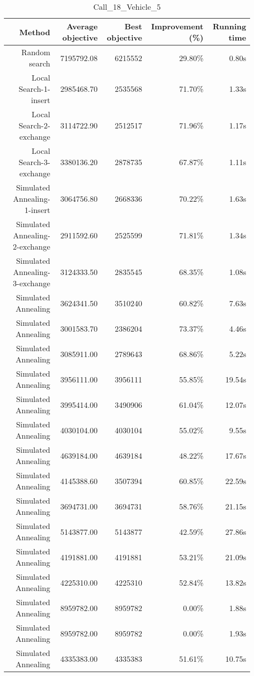 \begin{table}[ht]
\centering
\caption{Call\_18\_Vehicle\_5}
\label{tab:call18vehicle5}
\begin{tabular}{|r|r|r|r|r|}
Method & Average objective & Best objective & Improvement (\%) & Running time \\
\hline
Random search & 7195792.08 & 6215552 & 29.80\% & 0.80s\\
Local Search-1-insert & 2985468.70 & 2535568 & 71.70\% & 1.33s\\
Local Search-2-exchange & 3114722.90 & 2512517 & 71.96\% & 1.17s\\
Local Search-3-exchange & 3380136.20 & 2878735 & 67.87\% & 1.11s\\
Simulated Annealing-1-insert & 3064756.80 & 2668336 & 70.22\% & 1.63s\\
Simulated Annealing-2-exchange & 2911592.60 & 2525599 & 71.81\% & 1.34s\\
Simulated Annealing-3-exchange & 3124333.50 & 2835545 & 68.35\% & 1.08s\\
Simulated Annealing & 3624341.50 & 3510240 & 60.82\% & 7.63s\\
Simulated Annealing & 3001583.70 & 2386204 & 73.37\% & 4.46s\\
Simulated Annealing & 3085911.00 & 2789643 & 68.86\% & 5.22s\\
Simulated Annealing & 3956111.00 & 3956111 & 55.85\% & 19.54s\\
Simulated Annealing & 3995414.00 & 3490906 & 61.04\% & 12.07s\\
Simulated Annealing & 4030104.00 & 4030104 & 55.02\% & 9.55s\\
Simulated Annealing & 4639184.00 & 4639184 & 48.22\% & 17.67s\\
Simulated Annealing & 4145388.60 & 3507394 & 60.85\% & 22.59s\\
Simulated Annealing & 3694731.00 & 3694731 & 58.76\% & 21.15s\\
Simulated Annealing & 5143877.00 & 5143877 & 42.59\% & 27.86s\\
Simulated Annealing & 4191881.00 & 4191881 & 53.21\% & 21.09s\\
Simulated Annealing & 4225310.00 & 4225310 & 52.84\% & 13.82s\\
Simulated Annealing & 8959782.00 & 8959782 & 0.00\% & 1.88s\\
Simulated Annealing & 8959782.00 & 8959782 & 0.00\% & 1.93s\\
Simulated Annealing & 4335383.00 & 4335383 & 51.61\% & 10.75s\\

\end{tabular}
\end{table}
